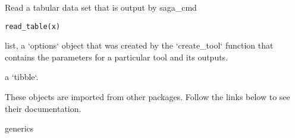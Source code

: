 \documentclass[a4paper]{book}
\begin{document}
%
\begin{Description}
Read a tabular data set that is output by saga\_cmd
\end{Description}
%
\begin{Usage}
\begin{verbatim}
read_table(x)
\end{verbatim}
\end{Usage}
%
\begin{Arguments}
\begin{ldescription}
\item[\code{x}] list, a `options` object that was created by the `create\_tool`
function that contains the parameters for a particular tool and its
outputs.
\end{ldescription}
\end{Arguments}
%
\begin{Value}
a `tibble`.
\end{Value}
%
\begin{Description}
These objects are imported from other packages. Follow the links
below to see their documentation.

\begin{description}

\item[generics] 

\end{description}
\end{Description}
%
\end{document}
